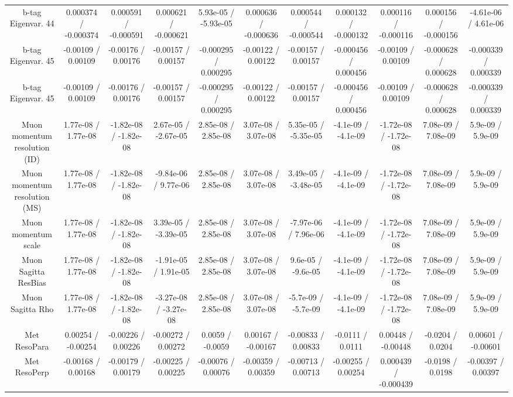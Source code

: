 \begin{table}[htbp]
\begin{center}
\begin{tabular}{|c|c|c|c|c|c|c|c|c|c|c|}
  b-tag Eigenvar. 44 & 0.000374 / -0.000374 & 0.000591 / -0.000591 & 0.000621 / -0.000621 & 5.93e-05 / -5.93e-05 & 0.000636 / -0.000636 & 0.000544 / -0.000544 & 0.000132 / -0.000132 & 0.000116 / -0.000116 & 0.000156 / -0.000156 & -4.61e-06 / 4.61e-06 \\ 
  b-tag Eigenvar. 45 & -0.00109 / 0.00109 & -0.00176 / 0.00176 & -0.00157 / 0.00157 & -0.000295 / 0.000295 & -0.00122 / 0.00122 & -0.00157 / 0.00157 & -0.000456 / 0.000456 & -0.00109 / 0.00109 & -0.000628 / 0.000628 & -0.000339 / 0.000339 \\ 
  b-tag Eigenvar. 45 & -0.00109 / 0.00109 & -0.00176 / 0.00176 & -0.00157 / 0.00157 & -0.000295 / 0.000295 & -0.00122 / 0.00122 & -0.00157 / 0.00157 & -0.000456 / 0.000456 & -0.00109 / 0.00109 & -0.000628 / 0.000628 & -0.000339 / 0.000339 \\ 
  Muon momentum resolution (ID) & 1.77e-08 / 1.77e-08 & -1.82e-08 / -1.82e-08 & 2.67e-05 / -2.67e-05 & 2.85e-08 / 2.85e-08 & 3.07e-08 / 3.07e-08 & 5.35e-05 / -5.35e-05 & -4.1e-09 / -4.1e-09 & -1.72e-08 / -1.72e-08 & 7.08e-09 / 7.08e-09 & 5.9e-09 / 5.9e-09 \\ 
  Muon momentum resolution (MS) & 1.77e-08 / 1.77e-08 & -1.82e-08 / -1.82e-08 & -9.84e-06 / 9.77e-06 & 2.85e-08 / 2.85e-08 & 3.07e-08 / 3.07e-08 & 3.49e-05 / -3.48e-05 & -4.1e-09 / -4.1e-09 & -1.72e-08 / -1.72e-08 & 7.08e-09 / 7.08e-09 & 5.9e-09 / 5.9e-09 \\ 
  Muon momentum scale & 1.77e-08 / 1.77e-08 & -1.82e-08 / -1.82e-08 & 3.39e-05 / -3.39e-05 & 2.85e-08 / 2.85e-08 & 3.07e-08 / 3.07e-08 & -7.97e-06 / 7.96e-06 & -4.1e-09 / -4.1e-09 & -1.72e-08 / -1.72e-08 & 7.08e-09 / 7.08e-09 & 5.9e-09 / 5.9e-09 \\ 
  Muon Sagitta ResBias & 1.77e-08 / 1.77e-08 & -1.82e-08 / -1.82e-08 & -1.91e-05 / 1.91e-05 & 2.85e-08 / 2.85e-08 & 3.07e-08 / 3.07e-08 & 9.6e-05 / -9.6e-05 & -4.1e-09 / -4.1e-09 & -1.72e-08 / -1.72e-08 & 7.08e-09 / 7.08e-09 & 5.9e-09 / 5.9e-09 \\ 
  Muon Sagitta Rho & 1.77e-08 / 1.77e-08 & -1.82e-08 / -1.82e-08 & -3.27e-08 / -3.27e-08 & 2.85e-08 / 2.85e-08 & 3.07e-08 / 3.07e-08 & -5.7e-09 / -5.7e-09 & -4.1e-09 / -4.1e-09 & -1.72e-08 / -1.72e-08 & 7.08e-09 / 7.08e-09 & 5.9e-09 / 5.9e-09 \\ 
  Met ResoPara & 0.00254 / -0.00254 & -0.00226 / 0.00226 & -0.00272 / 0.00272 & 0.0059 / -0.0059 & 0.00167 / -0.00167 & -0.00833 / 0.00833 & -0.0111 / 0.0111 & 0.00448 / -0.00448 & -0.0204 / 0.0204 & 0.00601 / -0.00601 \\ 
  Met ResoPerp & -0.00168 / 0.00168 & -0.00179 / 0.00179 & -0.00225 / 0.00225 & -0.00076 / 0.00076 & -0.00359 / 0.00359 & -0.00713 / 0.00713 & -0.00255 / 0.00254 & 0.000439 / -0.000439 & -0.0198 / 0.0198 & -0.00397 / 0.00397 \\ 

\end{tabular}
\end{center}
\end{table}
